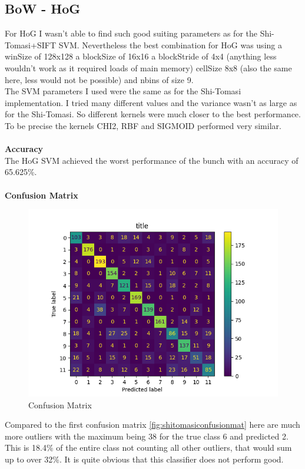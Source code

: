\documentclass[UTF-8]{article}
\begin{document}
\subsection{BoW - HoG}
For HoG I wasn't able to find such good suiting parameters as for the Shi-Tomasi+SIFT SVM. Nevertheless the best combination for HoG was using a winSize of 128x128 a blockSize of 16x16 a blockStride of 4x4 (anything less wouldn't work as it required loads of main memory) cellSize 8x8 (also the same here, less would not be possible) and nbins of size 9.\\
The SVM parameters I used were the same as for the Shi-Tomasi implementation. I tried many different values and the variance wasn't as large as for the Shi-Tomasi. So different kernels were much closer to the best performance. To be precise the kernels CHI2, RBF and SIGMOID performed very similar.\\
\\\textbf{Accuracy}\\
The HoG SVM achieved the worst performance of the bunch with an accuracy of 65.625\%.\\\\
\textbf{Confusion Matrix}
\begin{figure}[H]
	\centering
	\includegraphics[width=0.7\linewidth]{_images/HoGConfusionMat}
	\caption{Confusion Matrix}
	\label{fig:hogconfusionmat}
\end{figure}
Compared to the first confusion matrix \ref{fig:shitomasiconfusionmat} here are much more outliers with the maximum being 38 for the true class 6 and predicted 2. This is 18.4\% of the entire class not counting all other outliers, that would sum up to over 32\%. It is quite obvious that this classifier does not perform good.
\newpage
\end{document}
